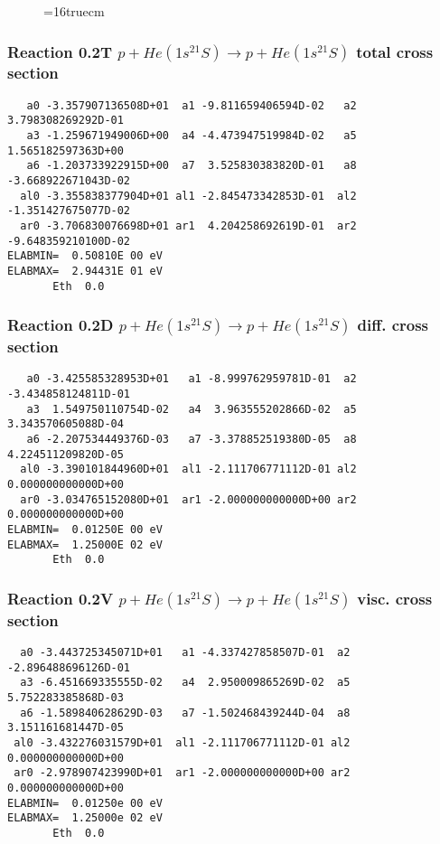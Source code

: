 \documentclass[12pt,dvipdfmx]{article}
\begin{document}
\begin{figure} \label{0.1}
\epsfxsize=16truecm
\end{figure}
\newpage

\subsubsection{
Reaction 0.2T   $ p + He(1s^21S) \rightarrow p + He (1s^21S)$ total cross section
}



\begin{small}\begin{verbatim}
   a0 -3.357907136508D+01  a1 -9.811659406594D-02   a2  3.798308269292D-01
   a3 -1.259671949006D+00  a4 -4.473947519984D-02   a5  1.565182597363D+00
   a6 -1.203733922915D+00  a7  3.525830383820D-01   a8 -3.668922671043D-02
  al0 -3.355838377904D+01 al1 -2.845473342853D-01  al2 -1.351427675077D-02
  ar0 -3.706830076698D+01 ar1  4.204258692619D-01  ar2 -9.648359210100D-02
ELABMIN=  0.50810E 00 eV
ELABMAX=  2.94431E 01 eV
       Eth  0.0
\end{verbatim}\end{small}

\subsubsection{
Reaction 0.2D    $p + He(1s^21S) \rightarrow p + He (1s^21S) $ diff. cross
section }


\begin{small}\begin{verbatim}
   a0 -3.425585328953D+01   a1 -8.999762959781D-01  a2 -3.434858124811D-01
   a3  1.549750110754D-02   a4  3.963555202866D-02  a5  3.343570605088D-04
   a6 -2.207534449376D-03   a7 -3.378852519380D-05  a8  4.224511209820D-05
  al0 -3.390101844960D+01  al1 -2.111706771112D-01 al2  0.000000000000D+00
  ar0 -3.034765152080D+01  ar1 -2.000000000000D+00 ar2  0.000000000000D+00
ELABMIN=  0.01250E 00 eV
ELABMAX=  1.25000E 02 eV
       Eth  0.0
\end{verbatim}\end{small}


\subsubsection{
Reaction 0.2V   $ p + He(1s^21S) \rightarrow p + He (1s^21S) $ visc. cross
section }


\begin{small}\begin{verbatim}
  a0 -3.443725345071D+01   a1 -4.337427858507D-01  a2 -2.896488696126D-01
  a3 -6.451669335555D-02   a4  2.950009865269D-02  a5  5.752283385868D-03
  a6 -1.589840628629D-03   a7 -1.502468439244D-04  a8  3.151161681447D-05
 al0 -3.432276031579D+01  al1 -2.111706771112D-01 al2  0.000000000000D+00
 ar0 -2.978907423990D+01  ar1 -2.000000000000D+00 ar2  0.000000000000D+00
ELABMIN=  0.01250e 00 eV
ELABMAX=  1.25000e 02 eV
       Eth  0.0
\end{verbatim}\end{small}
\end{document}
